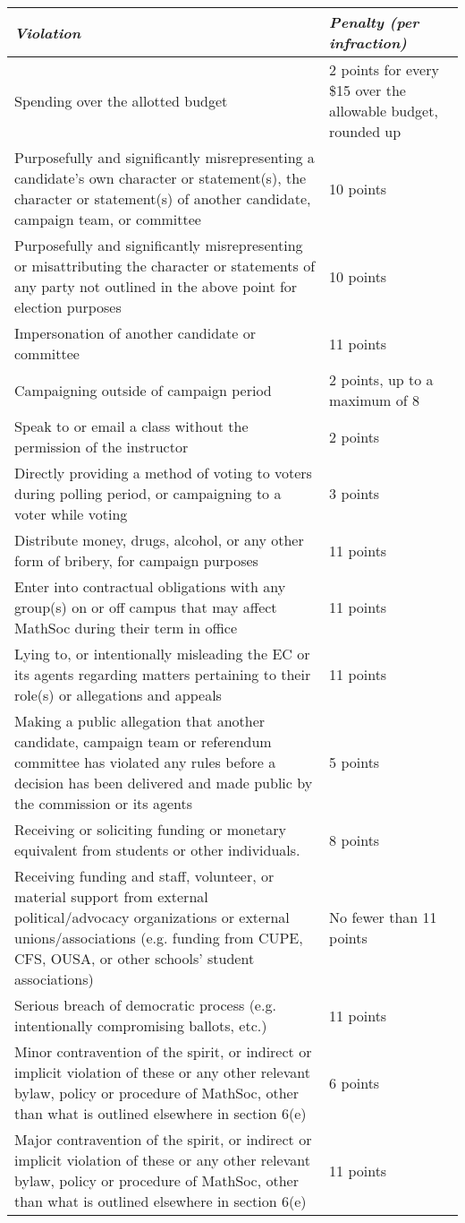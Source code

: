 \begin{tabular}{| p{12cm} | p{3.5cm} |}
\hline
\rowcolor{lightgray} \textit{\textbf{Violation}} & \textit{\textbf{Penalty (per infraction)}}  \\ 
 \hline
 Spending over the allotted budget & 2 points for every \$15 over the allowable budget, rounded up\\  
 \hline
 Purposefully and significantly misrepresenting a candidate’s own character or statement(s), the character or statement(s) of another candidate, campaign team, or committee & 10 points \\
 \hline
 Purposefully and significantly misrepresenting or misattributing the character or statements of any party not outlined in the above point for election purposes & 10 points \\
 \hline 
 Impersonation of another candidate or committee & 11 points \\
 \hline
 Campaigning outside of campaign period & 2 points, up to a maximum of 8 \\
 \hline
 Speak to or email a class without the permission of the instructor & 2 points \\
 \hline
 Directly providing a method of voting to voters during polling period, or campaigning to a voter while voting & 3 points \\
 \hline
 Distribute money, drugs, alcohol, or any other form of bribery, for campaign purposes & 11 points \\
 \hline 
 Enter into contractual obligations with any group(s) on or off campus that may affect MathSoc during their term in office & 11 points \\ 
 \hline 
 Lying to, or intentionally misleading the EC or its agents regarding matters pertaining to their role(s) or allegations and appeals & 11 points \\
 \hline
 Making a public allegation that another candidate, campaign team or referendum committee has violated any rules before a decision has been delivered and made public by the commission or its agents & 5 points \\
 \hline
 Receiving or soliciting funding or monetary equivalent from students or other individuals. & 8 points \\
 \hline 
 Receiving funding and staff, volunteer, or material support from external political/advocacy organizations or external unions/associations (e.g. funding from CUPE, CFS, OUSA, or other schools’ student associations) & No fewer than 11 points \\
 \hline 
 Serious breach of democratic process (e.g. intentionally compromising ballots, etc.) & 11 points \\ 
 \hline
 Minor contravention of the spirit, or indirect or implicit violation of these or any other relevant bylaw, policy or procedure of MathSoc, other than what is outlined elsewhere in section 6(e) & 6 points \\
 \hline
 Major contravention of the spirit, or indirect or implicit violation of these or any other relevant bylaw, policy or procedure of MathSoc, other than what is outlined elsewhere in section 6(e) & 11 points \\
 \hline
\end{tabular}

